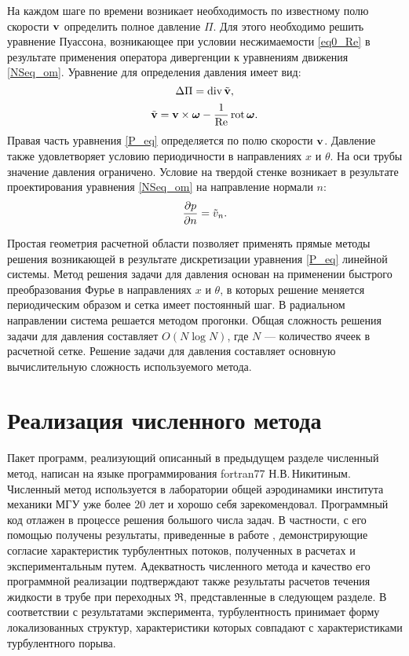 На каждом шаге по времени возникает необходимость по известному полю скорости $\mathbf{v}$ определить полное давление $\Pi$. Для этого необходимо решить уравнение Пуассона, возникающее при условии несжимаемости \eqref{eq0_Re} в результате применения оператора дивергенции к уравнениям движения \eqref{NSeq_om}. Уравнение для определения давления имеет вид:
\begin{equation}\label{P_eq}
\mathop{}\!\Delta \Pi = \mathop{}\!\operatorname{div} \tilde {\mathbf{v}},
\end{equation}
$$
\tilde {\mathbf{v}} =  \mathbf{v} \times \mbox{\boldmath$\omega$} - \frac{1}{\operatorname{Re}} \mathop{}\!\operatorname{rot} \mbox{\boldmath$\omega$}.
$$
Правая часть уравнения \eqref{P_eq} определяется по полю скорости $\mathbf{v}$. Давление также удовлетворяет условию периодичности в направлениях $x$ и $\theta$. На оси трубы значение давления ограничено. Условие на твердой стенке возникает в результате проектирования уравнения \eqref{NSeq_om} на направление нормали $n$:
$$
\frac{\partial p}{\partial n} = \tilde v_n.
$$


Простая геометрия расчетной области позволяет применять прямые методы решения возникающей в результате дискретизации уравнения \eqref{P_eq} линейной системы. Метод решения задачи для давления основан на применении быстрого преобразования Фурье в направлениях $x$ и $\theta$, в которых решение меняется периодическим образом и сетка имеет постоянный шаг. В радиальном направлении система решается методом прогонки. Общая сложность решения задачи для давления составляет $O(N \log N)$, где $N$ --- количество ячеек в расчетной сетке. Решение задачи для давления составляет основную вычислительную сложность используемого метода. 


\section{Реализация численного метода}

Пакет программ, реализующий описанный в предыдущем разделе численный метод, написан на языке программирования fortran77 Н.В.\,Никитиным. Численный метод используется в лаборатории общей аэродинамики института механики МГУ уже более 20 лет и хорошо себя зарекомендовал. Программный код отлажен в процессе решения большого числа задач. В частности, с его помощью получены результаты, приведенные в работе \cite{Nikitin2006}, демонстрирующие согласие характеристик турбулентных потоков, полученных в расчетах и экспериментальным путем. Адекватность численного метода и качество его программной реализации подтверждают также результаты расчетов течения жидкости в трубе при переходных $\Re$, представленные в следующем разделе. В соответствии с результатами эксперимента, турбулентность принимает форму локализованных структур, характеристики которых совпадают с характеристиками турбулентного порыва.

